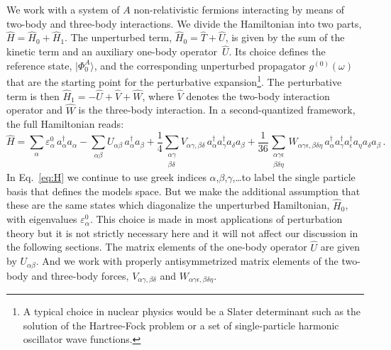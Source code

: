 We work with a system of $A$ non-relativistic fermions interacting by means of two-body and three-body interactions.
We divide the Hamiltonian into two parts, $\widehat H = \widehat H_0 + \widehat H_1$. 
The unperturbed term, $\widehat H_0 = \widehat T + \widehat U$, is given by the sum of the kinetic term and an auxiliary one-body operator~$\widehat U$.
Its choice defines the reference state, $\vert\Phi_0^A\rangle$, and the corresponding
unperturbed propagator $g^{(0)}(\omega)$ that are the starting point for the perturbative expansion\footnote{A typical choice in nuclear physics would be a Slater determinant such as the solution of the Hartree-Fock problem or a set of single-particle harmonic oscillator wave functions.}.  
The perturbative term is then  
$\widehat H_1 = -\widehat U + \widehat V + \widehat W$, where $\widehat V$ denotes the two-body interaction operator and $\widehat W$  is the three-body interaction.
In a second-quantized framework, the full Hamiltonian reads:
\begin{equation}
\label{eq:H}
\widehat H = \sum_{\alpha} \varepsilon^0_\alpha\, a^\dag_\alpha a_\alpha - \sum_{\alpha\beta}U_{\alpha \beta}\, a^\dag_\alpha a_{\beta}
+\frac{1}{4} \sum_{\substack{\alpha\gamma\\\beta\delta}}V_{\alpha\gamma,\beta\delta}\, a_\alpha^\dag a_\gamma^\dag a_{\delta} a_{\beta}
+\frac{1}{36}\sum_{\substack{\alpha\gamma\epsilon \\ \beta\delta\eta}} W_{\alpha\gamma\epsilon,\beta\delta\eta}\,
a_\alpha^\dag a_\gamma^\dag a_\epsilon^\dag a_{\eta} a_{\delta} a_{\beta} \, .
\end{equation}
In Eq.~\eqref{eq:H} we continue to use greek indices $\alpha$,$\beta$,$\gamma$,\ldots to label the single particle basis that defines the models space. But we make the additional assumption that these are the same states which diagonalize the unperturbed Hamiltonian, $\widehat H_0$, with eigenvalues $\varepsilon_\alpha^0$.    This choice is made in most  applications of  perturbation theory but it is not strictly necessary here and it will not affect our discussion in the following sections. 
The matrix elements of the one-body operator $\widehat U$ are given by $U_{\alpha \beta}$. And we  work with
properly antisymmetrized matrix elements of the two-body and three-body forces, $V_{\alpha\gamma,\beta\delta}$ and $W_{\alpha\gamma\epsilon,\beta\delta\eta}$.

